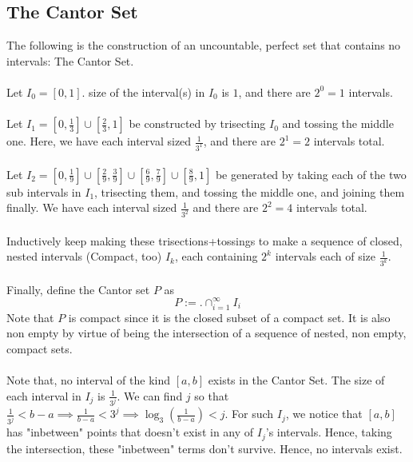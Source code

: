 \documentclass[../Main.tex]{subfiles}
\begin{document}
\subsection{The Cantor Set}
The following is the construction of an uncountable, perfect set that contains no intervals: The Cantor Set.
\\\\ Let $I_0=[0,1]$. size of the interval(s) in $I_0$ is $1$, and there are $2^0=1$ intervals.
\\\\ Let $I_1=[0,\frac{1}{3}]\cup[\frac{2}{3},1]$ be constructed by trisecting $I_0$ and tossing the middle one. Here, we have each interval sized $\frac{1}{3^1}$, and there are $2^1=2$ intervals total.
\\\\Let $I_2=[0,\frac{1}{9}]\cup[\frac{2}{9},\frac{3}{9}]\cup[\frac{6}{9},\frac{7}{9}]\cup[\frac{8}{9},1]$ be generated by taking each of the two sub intervals in $I_1$, trisecting them, and tossing the middle one, and joining them finally. We have each interval sized $\frac{1}{3^2}$ and there are $2^2=4$ intervals total.
\\\\Inductively keep making these trisections+tossings to make a sequence of closed, nested intervals (Compact, too) $I_k$, each containing $2^k$ intervals each of size $\frac{1}{3^k}$.
\\\\ Finally, define the Cantor set $P$ as $$P:= \big.\cap_{i=1}^{\infty}I_i $$ Note that $P$ is compact since it is the closed subset of a compact set. It is also non empty by virtue of being the intersection of a sequence of nested, non empty, compact sets.
\\\\Note that, no interval of the kind $[a,b]$ exists in the Cantor Set. The size of each interval in $I_j$ is $\frac{1}{3^j}$. We can find $j$ so that $\frac{1}{3^j}<b-a \implies \frac{1}{b-a}<3^j \implies \log_{3}(\frac{1}{b-a})<j$. For such $I_j$, we notice that $[a,b]$ has "inbetween" points that doesn't exist in any of $I_j$'s intervals. Hence, taking the intersection, these "inbetween" terms don't survive. Hence, no intervals exist.
\end{document}
